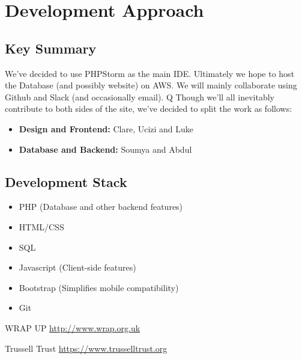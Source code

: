 \documentclass[12pt]{article}
\begin{document}
\section{Development Approach}

\subsection{Key Summary}
We've decided to use PHPStorm as the main IDE. Ultimately we hope to host the
Database (and possibly website) on AWS. We will mainly collaborate using
Github and Slack (and occasionally email).
Q
Though we'll all inevitably contribute to both sides of the site, we've
decided to split the work as follows:
\begin{itemize}
    \item \textbf{Design and Frontend:} Clare, Ucizi and Luke
    \item \textbf{Database and Backend:} Soumya and Abdul
\end{itemize}

\subsection{Development Stack}
\begin{itemize}
    \item PHP (Database and other backend features)
    \item HTML/CSS
    \item SQL
    \item Javascript (Client-side features)
    \item Bootstrap (Simplifies mobile compatibility)
    \item Git
\end{itemize}

\begin{thebibliography}{1}

   WRAP UP  \href{http://www.wrap.org.uk/sites/files/wrap/Household_food_waste_in_the_UK_2015_Report.pdf}{http://www.wrap.org.uk}

   Trussell Trust \href{https://www.trusselltrust.org/2015/11/18/uk-foodbank-use-still-at-record-levels-as-hunger-remains-major-concern-for-low-income-families/}{https://www.trusselltrust.org}
\end{thebibliography}
\end{document}
